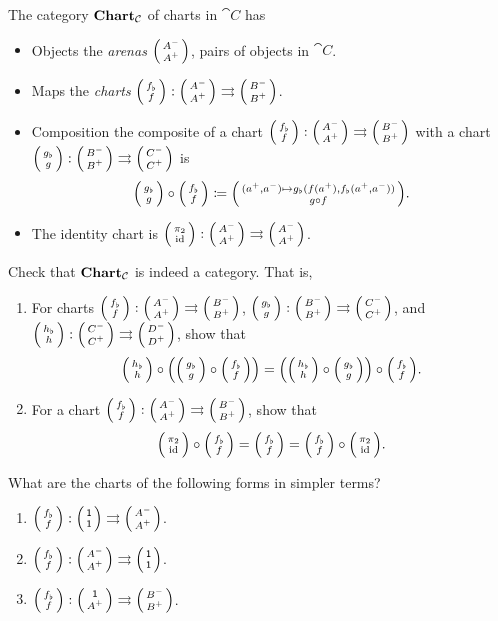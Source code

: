 \documentclass[DynamicalBook]{subfiles}
\begin{document}
\begin{definition}\label{def.category_of_charts}
  The category $\textbf{Chart}_{\mathcal{C}}$ of charts in $\cat{C}$ has
  \begin{itemize}
    \item Objects the \emph{arenas} $\lens{A^-}{A^+}$, pairs of objects in $\cat{C}$.
    \item Maps the \emph{charts} $\lens{f_{\flat}}{f} : \lens{A^-}{A^+}
      \tto \lens{B^-}{B^+}$.
    \item Composition the composite of a chart $\lens{f_{\flat}}{f} : \lens{A^-}{A^+}
      \tto \lens{B^-}{B^+}$ with a chart $\lens{g_{\flat}}{g} : \lens{B^-}{B^+}
      \tto \lens{C^-}{C^+}$ is 
$$\lens{g_{\flat}}{g} \circ \lens{f_{\flat}}{f} \coloneqq \lens{(a^+, a^-)
  \mapsto g_{\flat}(f(a^+), f_{\flat}(a^+, a^-))}{g \circ f}.$$
     \item The identity chart is $\lens{\pi_2}{\id} : \lens{A^-}{A^+}
       \rightrightarrows \lens{A^-}{A^+}$.
  \end{itemize}
\end{definition}
\begin{exercise}
  Check that $\textbf{Chart}_{\mathcal{C}}$ is indeed a category. That is,
  \begin{enumerate}
    \item For charts $\lens{f_{\flat}}{f} : \lens{A^-}{A^+}
      \tto \lens{B^-}{B^+}$, $\lens{g_{\flat}}{g} : \lens{B^-}{B^+}
      \tto \lens{C^-}{C^+}$, and $\lens{h_{\flat}}{h} : \lens{C^-}{C^+}
      \tto \lens{D^-}{D^+}$, show that 
$$\lens{h_{\flat}}{h} \circ \left( \lens{g_{\flat}}{g} \circ \lens{f_{\flat}}{f}
\right) = \left( \lens{h_{\flat}}{h} \circ \lens{g_{\flat}}{g} \right) \circ \lens{f_{\flat}}{f}.$$
    \item For a chart $\lens{f_{\flat}}{f} : \lens{A^-}{A^+}
      \tto \lens{B^-}{B^+}$, show that 
$$ \lens{\pi_2}{\id} \circ \lens{f_{\flat}}{f} = \lens{f_{\flat}}{f} =
\lens{f_{\flat}}{f} \circ \lens{\pi_2}{\id}.$$
  \end{enumerate}
\end{exercise}

\begin{exercise}\label{ex.special_charts}
  What are the charts of the following forms in simpler terms? 
  \begin{enumerate}
    \item $\lens{f_{\flat}}{f} : \lens{\ord{1}}{\ord{1}} \tto \lens{A^-}{A^+}$.
    \item $\lens{f_{\flat}}{f} : \lens{A^-}{A^+} \tto \lens{\ord{1}}{\ord{1}}$.
    \item $\lens{f_{\flat}}{f} : \lens{\ord{1}}{A^+} \tto \lens{B^-}{B^+}$.
   \end{enumerate}
\end{exercise}
\end{document}
